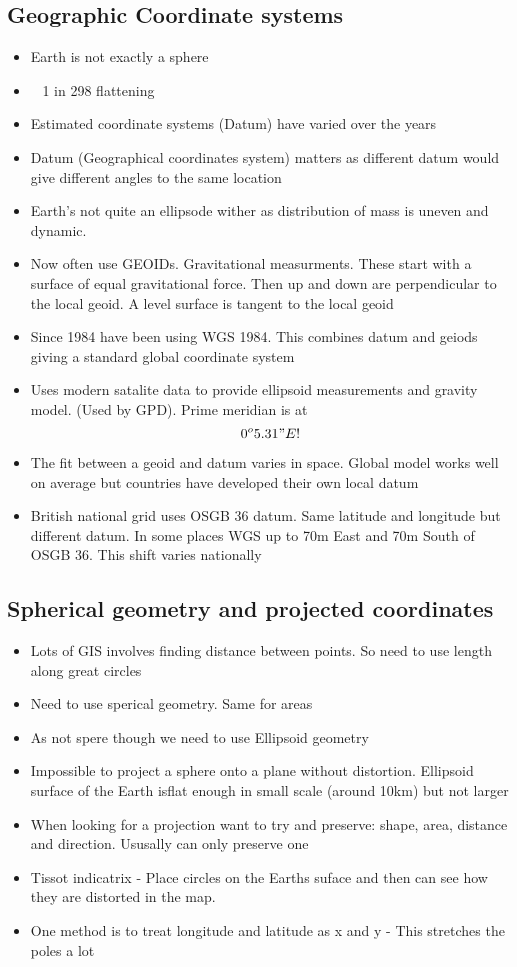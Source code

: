 \documentclass[11pt]{article}
\begin{document}
\subsection{Geographic Coordinate systems}
\begin{itemize}
\item Earth is not exactly a sphere
\item ~ 1 in 298 flattening
\item Estimated coordinate systems (Datum) have varied over the years
\item Datum (Geographical coordinates system) matters as different datum would give different angles to the same location
\item Earth's not quite an ellipsode wither as distribution of mass is uneven and dynamic.
\item Now often use GEOIDs. Gravitational measurments. These start with a surface of equal gravitational force. Then up and down are perpendicular to the local geoid. A level surface is tangent to the local geoid
\item Since 1984 have been using WGS 1984. This combines datum and geiods giving a standard global coordinate system
\item Uses modern satalite data to provide ellipsoid measurements and gravity model. (Used by GPD). Prime meridian is at 
\begin{equation}
0^o5.31"E!
\end{equation}
\item The fit between a geoid and datum varies in space. Global model works well on average but countries have developed their own local datum
\item British national grid uses OSGB 36 datum. Same latitude and longitude but different datum. In some places WGS up to 70m East and 70m South of OSGB 36. This shift varies nationally
\end{itemize}
\subsection{Spherical geometry and projected coordinates}
\begin{itemize}
\item Lots of GIS involves finding distance between points. So need to use length along great circles
\item Need to use sperical geometry. Same for areas
\item As not spere though we need to use Ellipsoid geometry
\item Impossible to project a sphere onto a plane without distortion. Ellipsoid surface of the Earth isflat enough in small scale (around 10km) but not larger
\item When looking for a projection want to try and preserve: shape, area, distance and direction. Ususally can only preserve one
\item Tissot indicatrix - Place circles on the Earths suface and then can see how they are distorted in the map.
\item One method is to treat longitude and latitude as x and y - This stretches the poles a lot
\end{itemize}
\end{document}
